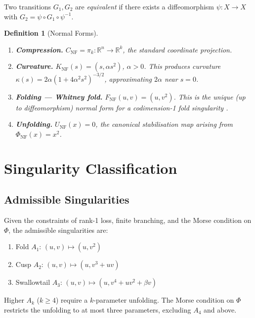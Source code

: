 \documentclass[12pt,a4paper]{article}
\newtheorem{definition}{Definition}[section]
\begin{document}
Two transitions $G_1, G_2$ are \emph{equivalent} if there exists a
diffeomorphism $\psi : X \to X$ with $G_2 = \psi \circ G_1 \circ
\psi^{-1}$.

\begin{definition}[Normal Forms]
\label{def:normalforms}
\begin{enumerate}[label=\textbf{NF\arabic*.},leftmargin=3em]
  \item \textbf{Compression.}
    $C_\mathrm{NF} = \pi_k : \mathbb{R}^n \to \mathbb{R}^k$,
    the standard coordinate projection.

  \item \textbf{Curvature.}
    $K_\mathrm{NF}(s) = (s, \alpha s^2)$, $\alpha > 0$.
    This produces curvature $\kappa(s) = 2\alpha(1 + 4\alpha^2 s^2)^{-3/2}$,
    approximating $2\alpha$ near $s = 0$.

  \item \textbf{Folding --- Whitney fold.}
    $F_\mathrm{NF}(u,v) = (u, v^2)$.
    This is the unique (up to diffeomorphism) normal form for a
    codimension-1 fold singularity \cite{Arnold1986}.

  \item \textbf{Unfolding.}
    $U_\mathrm{NF}(x) = 0$, the canonical stabilisation map arising
    from $\Phi_\mathrm{NF}(x) = x^2$.
\end{enumerate}
\end{definition}

\section{Singularity Classification}
\label{sec:singularities}

\subsection{Admissible Singularities}

Given the constraints of rank-1 loss, finite branching, and the Morse
condition on $\Phi$, the admissible singularities are:
\begin{enumerate}[leftmargin=2em]
  \item Fold $A_1$: $(u,v) \mapsto (u, v^2)$
  \item Cusp $A_2$: $(u,v) \mapsto (u, v^3 + uv)$
  \item Swallowtail $A_3$: $(u,v) \mapsto (u, v^4 + uv^2 + \beta v)$
\end{enumerate}
Higher $A_k$ ($k \geq 4$) require a $k$-parameter unfolding.
The Morse condition on $\Phi$ restricts the unfolding to at most three
parameters, excluding $A_4$ and above.
\end{document}
